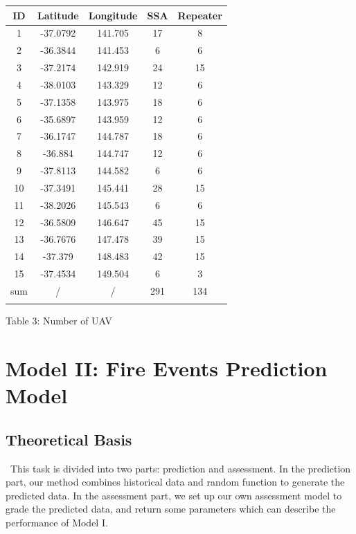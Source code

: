 \documentclass{mcmthesis}
\begin{document}
\begin{center}
	\begin{tabular}{ccccc}
		\hline
		ID & Latitude & Longitude & SSA & Repeater \\
		\hline

		1 & -37.0792 & 141.705 & 17 & 8 \\
		2 & -36.3844 & 141.453 & 6 & 6 \\
		3 & -37.2174 & 142.919 & 24 & 15 \\
		4 & -38.0103 & 143.329 & 12 & 6 \\
		5 & -37.1358 & 143.975 & 18 & 6 \\
		6 & -35.6897 & 143.959 & 12 & 6 \\
		7 & -36.1747 & 144.787 & 18 & 6 \\
		8 & -36.884 & 144.747 & 12 & 6 \\
		9 & -37.8113 & 144.582 & 6 & 6 \\
		10 & -37.3491 & 145.441 & 28 & 15 \\
		11 & -38.2026 & 145.543 & 6 & 6 \\
		12 & -36.5809 & 146.647 & 45 & 15 \\
		13 & -36.7676 & 147.478 & 39 & 15 \\
		14 & -37.379 & 148.483 & 42 & 15 \\
		15 & -37.4534 & 149.504 & 6 & 3 \\
		sum & / & /& 291 & 134 \\
		\hline
		\label{table:UAV}
	\end{tabular}
\end{center}
\begin{center}
	Table 3: Number of UAV
\end{center}

\section{Model II: Fire Events Prediction Model}
\subsection{Theoretical Basis}
\quad \, This task is divided into two parts: prediction and assessment. In the prediction part, our method combines historical data and random function to generate the predicted data. In the assessment part, we set up our own assessment model to grade the predicted data, and return some parameters which can describe the performance of Model I.
\end{document}
